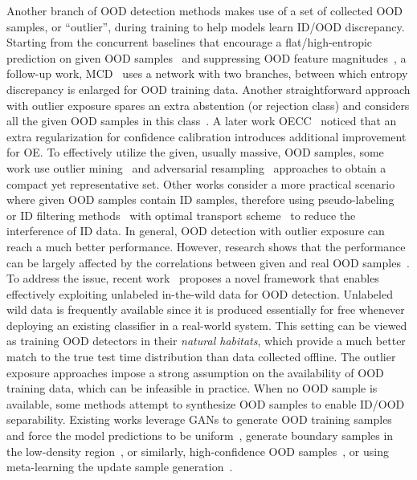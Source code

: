 \label{sec:ood_classification_oe}
Another branch of OOD detection methods makes use of a set of collected OOD samples, or ``outlier'', during training to help models learn ID/OOD discrepancy.
Starting from the concurrent baselines that encourage a flat/high-entropic prediction on given OOD samples~ and suppressing OOD feature magnitudes~, a follow-up work, MCD~ uses a network with two branches, between which entropy discrepancy is enlarged for OOD training data. Another straightforward approach with outlier exposure spares an extra abstention (or rejection class) and considers all the given OOD samples in this class~.
A later work OECC~ noticed that an extra regularization for confidence calibration introduces additional improvement for OE.
To effectively utilize the given, usually massive, OOD samples, some work use outlier mining~ and adversarial resampling~ approaches to obtain a compact yet representative set.
Other works consider a more practical scenario where given OOD samples contain ID samples, therefore using pseudo-labeling~ or ID filtering methods~ with optimal transport scheme~ to reduce the interference of ID data.
In general, OOD detection with outlier exposure can reach a much better performance. 
However, research shows that the performance can be largely affected by the correlations between given and real OOD samples~. To address the issue, recent work~ proposes a novel framework that enables effectively exploiting unlabeled in-the-wild data for OOD detection. Unlabeled wild data is frequently available since it is produced essentially for free whenever deploying an existing classifier in a real-world system. This setting can be viewed as training OOD detectors in their \emph{natural habitats}, which provide a much better match to the true test time distribution than data collected offline.
The outlier exposure approaches impose a strong assumption on the availability of OOD training data, which can be infeasible in practice. 
When no OOD sample is available, some methods attempt to synthesize OOD samples to enable ID/OOD separability.
Existing works leverage GANs to generate OOD training samples and force the model predictions to be uniform~, generate boundary samples in the low-density region~, or similarly, high-confidence OOD samples~, or using meta-learning the update sample generation~.
